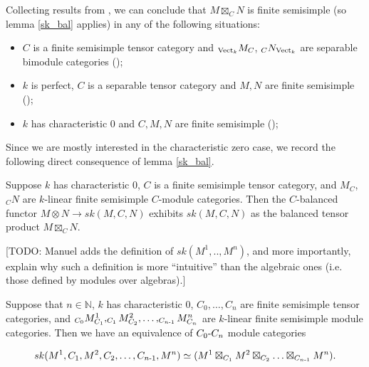 \begin{remark}\label{semisimple_douglas/dualizable-tensor-categories}

  \noindent Collecting results
  from \cite{douglas/dualizable-tensor-categories}, we can conclude that
  $M\boxtimes_C N$ is finite semisimple (so lemma \ref{sk_bal} applies) in any
  of the following situations:

  \begin{itemize}

    \item $C$ is a finite semisimple tensor category and $_{\operatorname{Vect}_k}M_C$,
    $_{C}N_{\operatorname{Vect}_k}$ are separable bimodule categories (\cite[Proposition
    2.5.3, Theorem 2.5.5]{douglas/dualizable-tensor-categories});

    \item $k$ is perfect, $C$ is a separable tensor category and $M,N$ are
    finite semisimple (\cite[Proposition
    2.5.10]{douglas/dualizable-tensor-categories});

    \item $k$ has characteristic $0$ and $C,M,N$ are finite semisimple
    (\cite[Corollary 2.6.9]{douglas/dualizable-tensor-categories});

  \end{itemize}
\end{remark}

Since we are mostly interested in the characteristic zero case, we record the
following direct consequence of lemma \ref{sk_bal}.

\begin{theorem}
   Suppose $k$ has characteristic $0$, $C$ is a finite semisimple tensor
   category, and $M_C$,$_{C}N$ are $k$-linear finite semisimple $C$-module
   categories. Then the $C$-balanced functor $M\otimes N\to sk(M,C,N)$
   exhibits $sk(M,C,N)$ as the balanced tensor product $M\boxtimes_C
   N$.
\end{theorem}

[TODO: Manuel adds the definition of $sk(M^{1},..,M^{n})$, and more
importantly, explain why such a definition is more ``intuitive'' than the
algebraic ones (i.e. those defined by modules over algebras).]

\begin{corollary}
  Suppose that $n \in \mathbb{N}$, $k$ has characteristic $0$, $C_{0}, \ldots,
  C_{n}$ are finite semisimple tensor categories, and $_{C_{0}}M^{1}_{C_{1}},
  _{C_{1}}M^{2}_{C_{2}}, \ldots, _{C_{n{\text -}1}}M^{n}_{C_{n}}$ are
  $k$-linear finite semisimple module categories. Then we have an equivalence
  of $C_{0}{\text -}C_{n}$ module categories

  \[
    sk(M^{1}, C_{1}, M^{2}, C_{2}, \ldots, C_{n{\text -} 1}, M^{n})
    \simeq
    (M^{1} \boxtimes_{C_{1}} M^{2} \boxtimes_{C_{2}} \ldots \boxtimes_{C_{n{\text -}1}} M^{n}).
  \]
\end{corollary}

